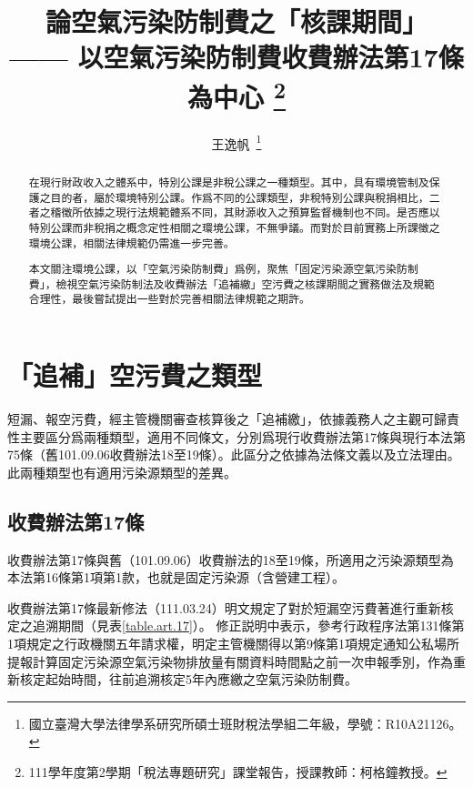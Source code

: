 \documentclass[11pt,a4paper]{article}
\author{王逸帆\,
\thanks{國立臺灣大學法律學系研究所碩士班財稅法學組二年級，學號：R10A21126。}
\vspace{-60em}
}
\date{}
\title{論空氣污染防制費之「核課期間」\\
\large —— 以空氣污染防制費收費辦法第17條為中心 \thanks{
  111學年度第2學期「稅法專題研究」課堂報告，授課教師：柯格鐘教授。}}
\begin{document}
\maketitle
\makeatother

\vspace{1pt}

\begin{abstract}
\setlength{\parindent}{2em}
\noindent
\hspace*{0.9\parindent}
在現行財政收入之體系中，特別公課是非稅公課之一種類型。其中，具有環境管制及保護之目的者，屬於環境特別公課。作爲不同的公課類型，非稅特別公課與稅捐相比，二者之稽徵所依據之現行法規範體系不同，其財源收入之預算監督機制也不同。是否應以特別公課而非稅捐之概念定性相關之環境公課，不無爭議。而對於目前實務上所課徵之環境公課，相關法律規範仍需進一步完善。

本文關注環境公課，以「空氣污染防制費」爲例，聚焦「固定污染源空氣污染防制費」，檢視空氣污染防制法及收費辦法「追補繳」空污費之核課期間之實務做法及規範合理性，最後嘗試提出一些對於完善相關法律規範之期許。

   \end{abstract}



\thispagestyle{empty} %
\clearpage
    

\tableofcontents 


\thispagestyle{empty} %
\clearpage
\setcounter{page}{1} %



\section{「追補」空污費之類型}

短漏、報空污費，經主管機關審查核算後之「追補繳」，依據義務人之主觀可歸責性主要區分爲兩種類型，適用不同條文，分別爲現行收費辦法第17條與現行本法第75條（舊101.09.06收費辦法18至19條）。此區分之依據為法條文義以及立法理由。此兩種類型也有適用污染源類型的差異。

\subsection{收費辦法第17條}

收費辦法第17條與舊（101.09.06）收費辦法的18至19條，所適用之污染源類型為本法第16條第1項第1款，也就是固定污染源（含營建工程）。

收費辦法第17條最新修法（111.03.24）明文規定了對於短漏空污費著進行重新核定之追溯期間（見表\ref{table.art.17}）。
修正説明中表示，參考行政程序法第131條第1項規定之行政機關五年請求權，明定主管機關得以第9條第1項規定通知公私場所提報計算固定污染源空氣污染物排放量有關資料時間點之前一次申報季別，作為重新核定起始時間，往前追溯核定5年內應繳之空氣污染防制費。

\end{document}
